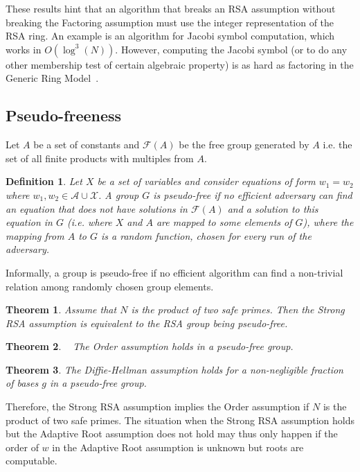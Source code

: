 \documentclass[a4paper]{article}
\newtheorem{definition}{Definition}
\newtheorem{theorem}{Theorem}
\begin{document}
These results hint that an algorithm that breaks an RSA assumption without breaking the Factoring assumption must use the integer representation of the RSA ring. An example is an algorithm for Jacobi symbol computation, which works in $O(\log^3(N))$. However, computing the Jacobi symbol (or to do any other membership test of certain algebraic property) is as hard as factoring in the Generic Ring Model~\cite{DBLP:journals/joc/JagerS13}.


\subsection{Pseudo-freeness}

Let $A$ be a set of constants and $\mathcal{F}(A)$ be the free group generated by $A$ i.e. the set of all finite products with multiples from $A$. 
\begin{definition}Let $X$ be a set of variables and consider equations of form $w_1 = w_2$ where $w_1,w_2\in\mathcal{A\cup X}$. A group $G$ is \emph{pseudo-free} if no efficient adversary can find an equation that does not have solutions in $\mathcal{F}(A)$ and a solution to this equation in $G$ (i.e. where $X$ and $A$ are mapped to some elements of $G$), where the mapping from $A$ to $G$ is a random function, chosen for every run of the adversary.
\end{definition}

Informally, a group is pseudo-free if no efficient algorithm can find a non-trivial relation among randomly chosen group elements.

\begin{theorem}\cite{DBLP:conf/tcc/Rivest04,DBLP:conf/eurocrypt/Micciancio05}
Assume that $N$ is the product of two safe primes. Then the Strong RSA assumption is equivalent to the RSA group being pseudo-free.
\end{theorem}

\begin{theorem}~\cite{DBLP:conf/tcc/Rivest04} The Order assumption holds in a pseudo-free group.
\end{theorem}

\begin{theorem}\cite{DBLP:journals/ijisec/HasegawaIST09}
The Diffie-Hellman assumption holds for a non-negligible fraction of bases $g$ in a pseudo-free group.
\end{theorem}

Therefore, the Strong RSA assumption implies the Order assumption if $N$ is the product of two safe primes. The situation when the Strong RSA assumption holds but the Adaptive Root assumption does not hold may thus only happen if the order of $w$ in the Adaptive Root assumption is unknown but roots are computable. 
\end{document}
